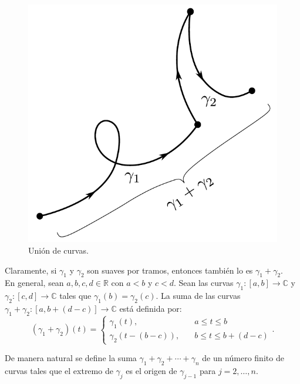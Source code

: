 \begin{figure}[H]
    \centering
    \includegraphics[scale = 0.5]{Figuras/Curva5.pdf}
    \caption{Unión de curvas.}
    \label{fig:Curva5}
\end{figure}

Claramente, si $\gamma_1$ y $\gamma_2$ son suaves por tramos, entonces también lo es $\gamma_1 + \gamma_2$.
\\

En general, sean $a, b, c,d \in \mathbb{R}$ con $a < b$ y $c < d$. Sean las curvas $\gamma_1 :[a,b] \longrightarrow \mathbb{C}$ y $\gamma_2 :[c,d] \longrightarrow \mathbb{C}$ tales que $\gamma_1(b) = \gamma_2(c)$. La suma de las curvas $\gamma_1 + \gamma_2: [a,b+(d-c)] \longrightarrow \mathbb{C}$ está definida por:
\begin{equation*}
(\gamma_1 + \gamma_2)(t) = \left\{ \begin{array}{cl}
\gamma_1(t), &\quad a \leq t \leq b \\
\gamma_2(t - (b-c)), &\quad b \leq t \leq b + (d-c)
\end{array}  \right. .
\end{equation*}

De manera natural se define la suma $\gamma_1 + \gamma_2 + \cdots + \gamma_n$ de un número finito de curvas tales que el extremo de $\gamma_j$ es el origen de $\gamma_{j-1}$ para $j = 2, \dots, n$.

